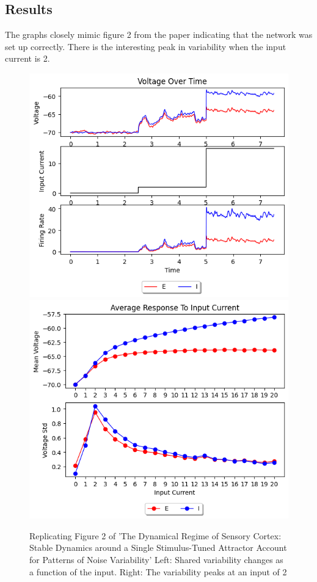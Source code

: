 \documentclass[10pt]{article}
\begin{document}
\subsection{Results}
The graphs closely mimic figure 2 from the paper indicating that the network was set up correctly. There is the interesting peak in variability when the input current is 2.
\begin{figure}[h]
    \includegraphics[scale=.5]{oneRegion/threeStepVoltage.png}
    \includegraphics[scale=.5]{oneRegion/manyStepVariablility.png}
    \caption{Replicating Figure 2 of 'The Dynamical Regime of Sensory Cortex: Stable Dynamics around a Single Stimulus-Tuned Attractor Account for Patterns of Noise Variability' Left: Shared variability changes as a function of the input. Right: The variability peaks at an input of 2 }
\end{figure}
\end{document}

